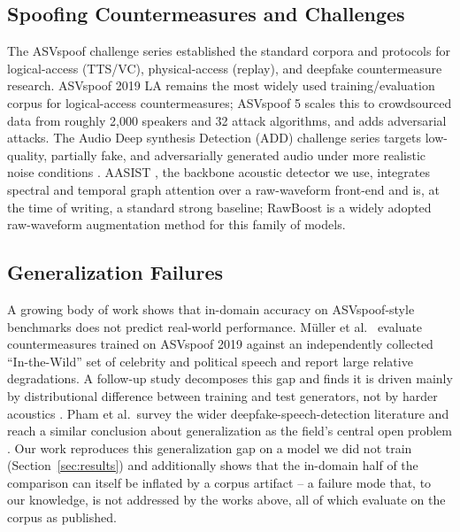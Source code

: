 \documentclass[conference]{IEEEtran}
\begin{document}
\subsection{Spoofing Countermeasures and Challenges}
The ASVspoof challenge series established the standard corpora and
protocols for logical-access (TTS/VC), physical-access (replay), and
deepfake countermeasure research. ASVspoof 2019 LA
\cite{asvspoof2019} remains the most widely used training/evaluation
corpus for logical-access countermeasures; ASVspoof 5
\cite{asvspoof5} scales this to crowdsourced data from roughly 2{,}000
speakers and 32 attack algorithms, and adds adversarial attacks. The
Audio Deep synthesis Detection (ADD) challenge series targets
low-quality, partially fake, and adversarially generated audio under
more realistic noise conditions \cite{add2022}. AASIST
\cite{aasist}, the backbone acoustic detector we use, integrates
spectral and temporal graph attention over a raw-waveform front-end and
is, at the time of writing, a standard strong baseline; RawBoost
\cite{rawboost} is a widely adopted raw-waveform augmentation method for
this family of models.

\subsection{Generalization Failures}
A growing body of work shows that in-domain accuracy on ASVspoof-style
benchmarks does not predict real-world performance. M\"uller et al.\
\cite{mueller2022generalize} evaluate countermeasures trained on
ASVspoof 2019 against an independently collected ``In-the-Wild'' set of
celebrity and political speech and report large relative degradations.
A follow-up study decomposes this gap and finds it is driven mainly by
distributional difference between training and test generators, not by
harder acoustics \cite{mueller2024harder}. Pham et al.\ survey the wider
deepfake-speech-detection literature and reach a similar conclusion
about generalization as the field's central open problem
\cite{pham2024survey}. Our work reproduces this generalization gap on a
model we did not train (Section~\ref{sec:results}) and additionally
shows that the in-domain half of the comparison can itself be inflated
by a corpus artifact -- a failure mode that, to our knowledge, is not
addressed by the works above, all of which evaluate on the corpus as
published.
\end{document}
